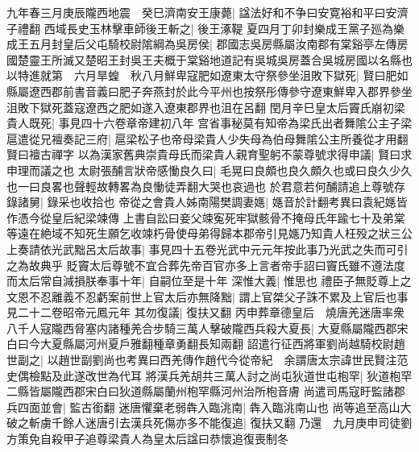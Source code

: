 九年春三月庚辰隴西地震　癸巳濟南安王康薨|{
	諡法好和不争曰安寛裕和平曰安濟子禮翻}
西域長史玉林擊車師後王斬之|{
	後王涿鞮}
夏四月丁卯封樂成王黨子廵為樂成王五月封皇后父屯騎校尉隂綱為吳房侯|{
	郡國志吳房縣屬汝南郡有棠谿亭左傳房國楚靈王所滅又楚昭王封吳王夫概于棠谿地道記有吳城吳房蓋合吳城房國以名縣也}
以特進就第　六月旱蝗　秋八月鮮卑寇肥如遼東太守祭參坐沮敗下獄死|{
	賢曰肥如縣屬遼西郡前書音義曰肥子奔燕封於此今平州也按祭彤傳參守遼東鮮卑入郡界參坐沮敗下獄死蓋寇遼西之肥如遂入遼東郡界也沮在呂翻}
閏月辛巳皇太后竇氏崩初梁貴人既死|{
	事見四十六卷章帝建初八年}
宫省事秘莫有知帝為梁氏出者舞隂公主子梁扈遣從兄襢奏記三府|{
	扈梁松子也帝母梁貴人少失母為伯母舞隂公主所養從才用翻賢曰襢古禪字}
以為漢家舊典崇貴母氏而梁貴人親育聖躬不蒙尊號求得申議|{
	賢曰求申理而議之也}
太尉張酺言狀帝感慟良久曰|{
	毛晃曰良頗也良久頗久也或曰良久少久也一曰良畧也聲輕故轉畧為良慟徒弄翻大哭也哀過也}
於君意若何酺請追上尊號存錄諸舅|{
	錄采也收拾也}
帝從之會貴人姊南陽樊調妻嫕|{
	嫕音於計翻考異曰袁紀嫕皆作憑今從皇后紀梁竦傳}
上書自訟曰妾父竦寃死牢獄骸骨不掩母氏年踰七十及弟棠等遠在絶域不知死生願乞收竦朽骨使母弟得歸本郡帝引見嫕乃知貴人枉殁之狀三公上奏請依光武黜呂太后故事|{
	事見四十五卷光武中元元年按此事乃光武之失而可引之為故典乎}
貶竇太后尊號不宜合葬先帝百官亦多上言者帝手詔曰竇氏雖不遵法度而太后常自減損朕奉事十年|{
	自嗣位至是十年}
深惟大義|{
	惟思也}
禮臣子無貶尊上之文恩不忍離義不忍虧案前世上官太后亦無降黜|{
	謂上官桀父子誅不累及上官后也事見二十二卷昭帝元鳳元年}
其勿復議|{
	復扶又翻}
丙申葬章德皇后　燒唐羌迷唐率衆八千人寇隴西脅塞内諸種羌合步騎三萬人擊破隴西兵殺大夏長|{
	大夏縣屬隴西郡宋白曰今大夏縣屬河州夏戶雅翻種章勇翻長知兩翻}
詔遣行征西將軍劉尚越騎校尉趙世副之|{
	以趙世副劉尚也考異曰西羌傳作趙代今從帝紀　余謂唐太宗諱世民賢注范史偶檢點及此遂改世為代耳}
將漢兵羌胡共三萬人討之尚屯狄道世屯枹罕|{
	狄道枹罕二縣皆屬隴西郡宋白曰狄道縣屬蘭州枹罕縣河州治所枹音膚}
尚遣司馬寇盱監諸郡兵四面並會|{
	監古銜翻}
迷唐懼棄老弱犇入臨洮南|{
	犇入臨洮南山也}
尚等追至高山大破之斬虜千餘人迷唐引去漢兵死傷亦多不能復追|{
	復扶又翻}
乃還　九月庚申司徒劉方策免自殺甲子追尊梁貴人為皇太后諡曰恭懷追復喪制冬


